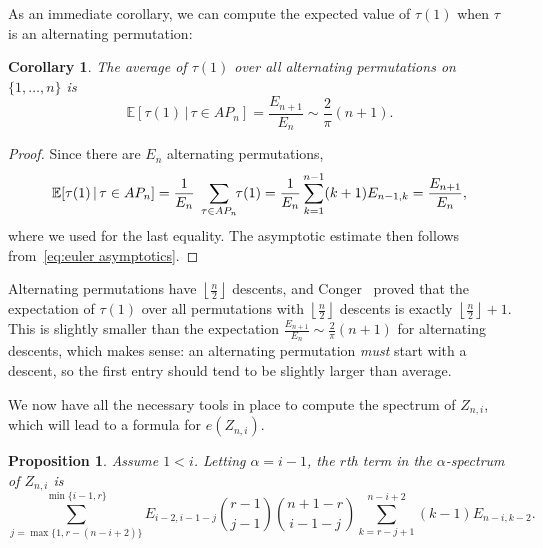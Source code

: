 \documentclass{article}
\newtheorem{proposition}[theorem]{Proposition}
\newtheorem{corollary}[theorem]{Corollary}
\theoremstyle{definition}
\newcommand{\ent}[2]{E_{#1,#2}}
\begin{document}
As an immediate corollary, we can compute the expected value of $\tau(1)$ when $\tau$ is an alternating permutation:

\begin{corollary}\label{cor:expected first entry}
	The average of $\tau(1)$ over all alternating permutations on $\{1,\dots , n\}$ is
	\[
		\mathbb{E}[\tau(1) \,|\, \tau \in AP_n] = \frac{E_{n+1}}{E_n} \sim \frac{2}{\pi}(n+1).
	\]
\end{corollary}

\begin{proof}
	Since there are $E_n$ alternating permutations,
	\[
		\mathbb{E}[\tau(1) \,|\, \tau \in AP_n] = \frac{1}{E_n}\; \smashoperator[r]{\sum_{\tau \in AP_n}}\; \tau(1) = \frac{1}{E_n} \sum_{k=1}^{n-1} (k+1) \ent{n-1}{k} = \frac{E_{n+1}}{E_n},
	\]
	where we used  for the last equality. The asymptotic estimate then follows from~\eqref{eq:euler asymptotics}.
\end{proof}

Alternating permutations have $\left\lfloor \frac{n}{2} \right\rfloor$ descents, and Conger~\cite{congerRefinementEulerianNumbers2010} proved that the expectation of $\tau(1)$ over all permutations with $\left\lfloor \frac{n}{2} \right\rfloor$ descents is exactly $\left\lfloor \frac{n}{2} \right\rfloor + 1$. This is slightly smaller than the expectation $\frac{E_{n+1}}{E_n} \sim \frac{2}{\pi}(n+1)$ for alternating descents, which makes sense: an alternating permutation \emph{must} start with a descent, so the first entry should tend to be slightly larger than average.

We now have all the necessary tools in place to compute the spectrum of $Z_{n,i}$, which will lead to a formula for $e(Z_{n,i})$.

\begin{proposition}\label{prop:augmented zigzag spectrum}
	Assume $1<i$. Letting $\alpha = i-1$, the $r$th term in the $\alpha$-spectrum of $Z_{n,i}$ is
	\[
		\sum_{j=\max\{1,r-(n-i+2)\}}^{\min\{i-1,r\}} \ent{i-2}{i-1-j} \binom{r-1}{j-1}\binom{n+1-r}{i-1-j}\sum_{k = r-j+1}^{n-i+2}(k-1)\ent{n-i}{k-2}.
	\]
\end{proposition}
\end{document}
